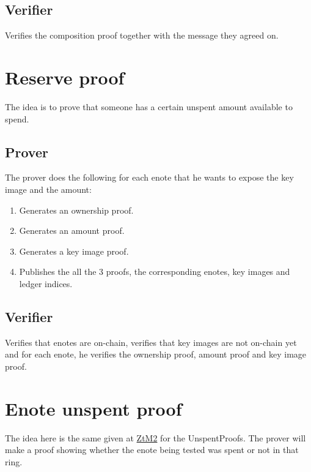 \documentclass[usletter,11pt,english,oneside,onecolumn,final,openany]{report}
\begin{document}
\subsection{Verifier}

Verifies the composition proof together with the message they agreed on.


\section{Reserve proof}

The idea is to prove that someone has a certain unspent amount available to spend.

\subsection{Prover}

The prover does the following for each enote that he wants to expose the key image and the amount:

\begin{enumerate}
    \item Generates an ownership proof.
    \item Generates an amount proof.
    \item Generates a key image proof.
    \item Publishes the all the 3 proofs, the corresponding enotes, key images and ledger indices.

\end{enumerate}
	
\subsection{Verifier}

Verifies that enotes are on-chain, verifies that key images are not on-chain yet and for each enote, he verifies the ownership proof, amount proof and key image proof.


\section{Enote unspent proof}

The idea here is the same given at \href{https://web.getmonero.org/library/Zero-to-Monero-2-0-0.pdf}{ZtM2} for the UnspentProofs. The prover will make a proof showing whether the enote being tested was spent or not in that ring.
\end{document}
